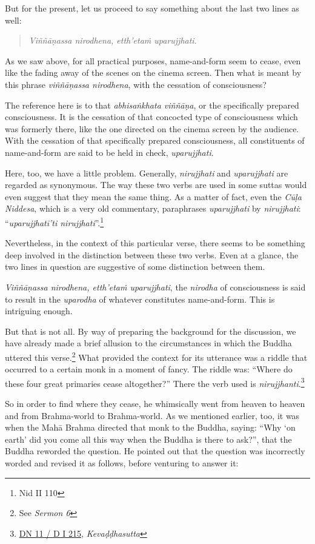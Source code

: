 But for the present, let us proceed to say something about the last two lines as well:

\begin{quote}
\emph{Viññāṇassa nirodhena, etth'etaṁ uparujjhati}.
\end{quote}

As we saw above, for all practical purposes, name-and-form seem to cease, even like the fading away of the scenes on the cinema screen. Then what is meant by this phrase \emph{viññāṇassa nirodhena}, with the cessation of consciousness?

The reference here is to that \emph{abhisaṅkhata viññāṇa}, or the specifically prepared consciousness. It is the cessation of that concocted type of consciousness which was formerly there, like the one directed on the cinema screen by the audience. With the cessation of that specifically prepared consciousness, all constituents of name-and-form are said to be held in check, \emph{uparujjhati}.

Here, too, we have a little problem. Generally, \emph{nirujjhati} and \emph{uparujjhati} are regarded as synonymous. The way these two verbs are used in some suttas would even suggest that they mean the same thing. As a matter of fact, even the \emph{Cūḷa Niddesa}, which is a very old commentary, paraphrases \emph{uparujjhati} by \emph{nirujjhati}: ``\emph{uparujjhatī'ti nirujjhati}''.\footnote{Nid II 110}

Nevertheless, in the context of this particular verse, there seems to be something deep involved in the distinction between these two verbs. Even at a glance, the two lines in question are suggestive of some distinction between them.

\emph{Viññāṇassa nirodhena, etth'etaṁ uparujjhati}, the \emph{nirodha} of consciousness is said to result in the \emph{uparodha} of whatever constitutes name-and-form. This is intriguing enough.

But that is not all. By way of preparing the background for the discussion, we have already made a brief allusion to the circumstances in which the Buddha uttered this verse.\footnote{See \emph{Sermon 6}} What provided the context for its utterance was a riddle that occurred to a certain monk in a moment of fancy. The riddle was: ``Where do these four great primaries cease altogether?'' There the verb used is \emph{nirujjhanti}.\footnote{\href{https://suttacentral.net/dn11/pli/ms}{DN 11 / D I 215}, \emph{Kevaḍḍhasutta}}

So in order to find where they cease, he whimsically went from heaven to heaven and from Brahma-world to Brahma-world. As we mentioned earlier, too, it was when the Mahā Brahma directed that monk to the Buddha, saying: ``Why `on earth' did you come all this way when the Buddha is there to ask?'', that the Buddha reworded the question. He pointed out that the question was incorrectly worded and revised it as follows, before venturing to answer it:

